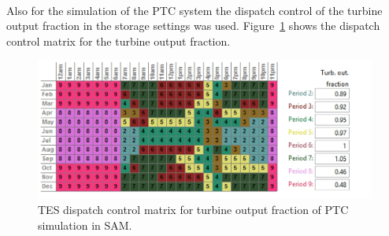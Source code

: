 \documentclass[Master,MEE,english]{twbook}%
\begin{document}
\\
Also for the simulation of the PTC system the dispatch control of the turbine output fraction in the storage settings was used. Figure~\ref{PTC_turbineoutput} shows the dispatch control matrix for the turbine output fraction.
\begin{figure}[htbp]  
\centering
\includegraphics[width=0.95\linewidth]{FIG/PTC_turbineoutput}
\caption[TES dispatch control matrix for turbine output fraction of PTC simulation in SAM.]{TES dispatch control matrix for turbine output fraction of PTC simulation in SAM.}\label{PTC_turbineoutput}
\end{figure}
\pagebreak
\end{document}

